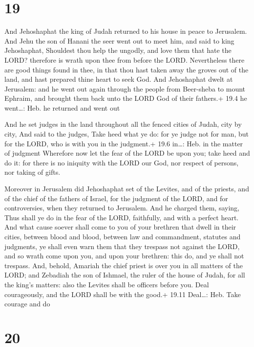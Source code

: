 \hypertarget{section-18}{%
\section{19}\label{section-18}}

 And Jehoshaphat the king of Judah returned to his house in
peace to Jerusalem.  And Jehu the son of Hanani the seer
went out to meet him, and said to king Jehoshaphat, Shouldest thou help
the ungodly, and love them that hate the LORD? therefore is wrath upon
thee from before the LORD.  Nevertheless there are good
things found in thee, in that thou hast taken away the groves out of the
land, and hast prepared thine heart to seek God.  And
Jehoshaphat dwelt at Jerusalem: and he went out again through the people
from Beer-sheba to mount Ephraim, and brought them back unto the LORD
God of their fathers.+ 19.4 he went\ldots: Heb. he returned and went out

 And he set judges in the land throughout all the fenced
cities of Judah, city by city,  And said to the judges, Take
heed what ye do: for ye judge not for man, but for the LORD, who is with
you in the judgment.+ 19.6 in\ldots: Heb. in the matter of judgment
 Wherefore now let the fear of the LORD be upon you; take
heed and do it: for there is no iniquity with the LORD our God, nor
respect of persons, nor taking of gifts.

 Moreover in Jerusalem did Jehoshaphat set of the Levites,
and of the priests, and of the chief of the fathers of Israel, for the
judgment of the LORD, and for controversies, when they returned to
Jerusalem.  And he charged them, saying, Thus shall ye do in
the fear of the LORD, faithfully, and with a perfect heart.
 And what cause soever shall come to you of your brethren
that dwell in their cities, between blood and blood, between law and
commandment, statutes and judgments, ye shall even warn them that they
trespass not against the LORD, and so wrath come upon you, and upon your
brethren: this do, and ye shall not trespass.  And, behold,
Amariah the chief priest is over you in all matters of the LORD; and
Zebadiah the son of Ishmael, the ruler of the house of Judah, for all
the king's matters: also the Levites shall be officers before you. Deal
courageously, and the LORD shall be with the good.+ 19.11 Deal\ldots:
Heb. Take courage and do

\hypertarget{section-19}{%
\section{20}\label{section-19}}

